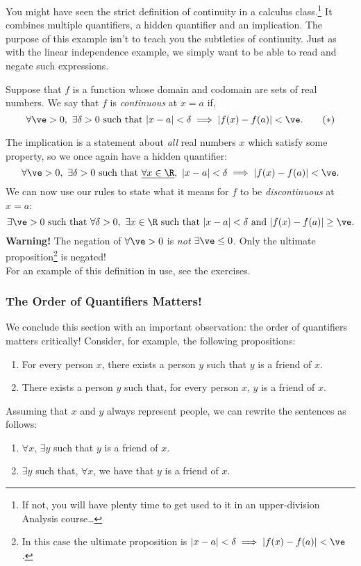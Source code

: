 You might have seen the strict definition of continuity in a calculus class.\footnote{If not, you will have plenty time to get used to it in an upper-division Analysis course\ldots} It combines multiple quantifiers, a hidden quantifier and an implication. The purpose of this example isn't to teach you the subtleties of continuity. Just as with the linear independence example, we simply want to be able to read and negate such expressions.

\begin{defn}\label{defn:cont}
Suppose that $f$ is a function whose domain and codomain are sets of real numbers. We say that $f$ is \emph{continuous} at $x=a$ if,
\[\forall\ve >0,\ \exists\delta>0\text{ such that }|x-a|<\delta\implies |f(x)-f(a)|<\ve.\tag*{($\ast$)}\]
\end{defn}

\noindent The implication is a statement about \emph{all} real numbers $x$ which satisfy some property, so we once again have a hidden quantifier:
\[\forall\ve>0,\ \exists\delta>0\text{ such that }\underline{\forall x\in\R},\ |x-a|<\delta\implies |f(x)-f(a)|<\ve.\]
We can now use our rules to state what it means for $f$ to be \emph{discontinuous} at $x=a$:
\[\exists\ve>0\text{ such that }\forall\delta>0,\ \exists x\in\R\text{ such that }|x-a|<\delta\text{ and }|f(x)-f(a)|\ge\ve.\]
{\bf Warning!} The negation of $\forall\ve>0$ is \emph{not} $\exists\ve\le 0$. Only the ultimate proposition\footnote{In this case the ultimate proposition is $|x-a|<\delta\implies |f(x)-f(a)|<\ve$.} is negated!\\
For an example of this definition in use, see the exercises.

\subsubsection*{The Order of Quantifiers Matters!}

We conclude this section with an important observation: the order of quantifiers matters critically! Consider, for example, the following propositions: 
\begin{enumerate}
\item For every person $x$, there exists a person $y$ such that $y$ is a friend of $x$. 
\item There exists a person $y$ such that, for every person $x$, $y$ is a friend of $x$. 
\end{enumerate}
Assuming that $x$ and $y$ always represent people, we can rewrite the sentences as follows:
\begin{enumerate}
\item $\forall x,\,\exists y$ such that $y$ is a friend of $x$.
\item $\exists y$ such that, $\forall x$, we have that $y$ is a friend of $x$.
\end{enumerate}


